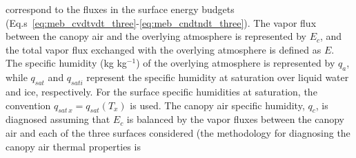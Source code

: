 correspond to the fluxes in the surface energy budgets
(Eq.s~\ref{eq:meb_cvdtvdt_three}-\ref{eq:meb_cndtndt_three}).
The vapor flux between the canopy air and the overlying atmosphere is
represented by $E_c$, 
and the total vapor flux exchanged with the overlying
atmosphere is defined as $E$.
%
%
%
%
The specific humidity (kg kg$^{-1}$) of the overlying
atmosphere is represented by $q_a$, while $q_{sat}$ and $q_{sati}$
represent the specific
humidity at saturation over liquid water and ice, respectively.
For the surface specific humidities at saturation,
the convention $q_{sat\,x} = q_{sat}\left(T_x\right)$ is used.
%
%
%
The canopy air specific humidity, $q_c$, is diagnosed
%
assuming that $E_c$ is balanced by the vapor fluxes between the canopy
air and each of the three surfaces considered
(the methodology for diagnosing the canopy air thermal properties is
